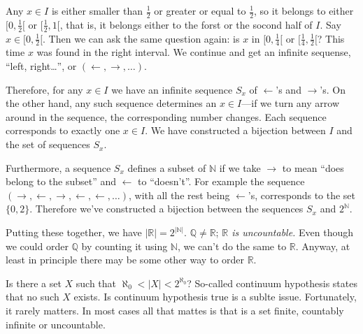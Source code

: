 \documentclass[11pt,oneside,%
]{memoir}
\newenvironment{eqna}{\begin{IEEEeqnarray}{c}}{\end{IEEEeqnarray}\ignorespacesafterend}
\theoremstyle{definition}
\newcommand{\NN}{\mathbb{N}}
\newcommand{\RR}{\mathbb{R}}
\newcommand{\QQ}{\mathbb{Q}}
\begin{document}
Any \(x\in I\) is either smaller than \(\frac{1}{2}\) or greater or equal to \(\frac{1}{2}\), so it belongs to either \([0,\frac{1}{2}[\) or \([\frac{1}{2},1[\), that is, it belongs either to the forst or the socond half of \(I\). Say \(x\in[0,\frac{1}{2}[\). Then we can ask the same question again: is \(x\) in \([0,\frac{1}{4}[\) or \([\frac{1}{4},\frac{1}{2}[\)? This time \(x\) was found in the right interval. We continue and get an infinite sequense, ``left, right\ldots'', or \((\leftarrow,\rightarrow,\dotsc)\).

Therefore, for any \(x\in I\) we have an infinite sequence \(S_x\) of \(\leftarrow\)'s and \(\rightarrow\)'s. On the other hand, any such sequence determines an \(x\in I\)---if we turn any arrow around in the sequence, the corresponding number changes. Each sequence corresponds to exactly one \(x\in I\). We have constructed a bijection between \(I\) and the set of sequences \(S_x\).

Furthermore, a sequence \(S_x\) defines a subset of \(\NN\) if we take \(\rightarrow\) to mean ``does belong to the subset'' and \(\leftarrow\) to ``doesn't''. For example the sequence \((\rightarrow,\leftarrow,\rightarrow,\leftarrow,\leftarrow,\dotsc)\), with all the rest being \(\leftarrow\)'s, corresponds to the set \(\lbrace0,2\rbrace\). Therefore we've constructed a bijection between the sequences \(S_x\) and \(2^\NN\).

Putting these together, we have \(|\RR|=2^{|\NN|}\). \(\QQ\neq\RR\); \emph{\(\RR\) is uncountable.} Even though we could order \(\QQ\) by counting it using \(\NN\), we can't do the same to \(\RR\). Anyway, at least in principle there may be some other way to order \(\RR\).

Is there a set \(X\) such that \(\aleph_0<|X|<2^{\aleph_0}\)? So-called continuum hypothesis states that no such \(X\) exists. Is continuum hypothesis true is a sublte issue. Fortunately, it rarely matters. In most cases all that mattes is that is a set finite, countably infinite or uncountable.

    
\end{document}
